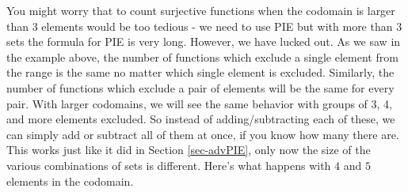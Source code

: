 \documentclass[12pt]{article}
\begin{document}
You might worry that to count surjective functions when the codomain is larger than 3 elements would be too tedious - we need to use PIE but with more than 3 sets the formula for PIE is very long.  However, we have lucked out.  As we saw in the example above, the number of functions which exclude a single element from the range is the same no matter which single element is excluded.  Similarly, the number of functions which exclude a pair of elements will be the same for every pair.  With larger codomains, we will see the same behavior with groups of 3, 4, and more elements excluded.  So instead of adding/subtracting each of these, we can simply add or subtract all of them at once, if you know how many there are.  This works just like it did in Section \ref{sec-advPIE}, only now the size of the various combinations of sets is different.  Here's what happens with $4$ and $5$ elements in the codomain.
\end{document}
